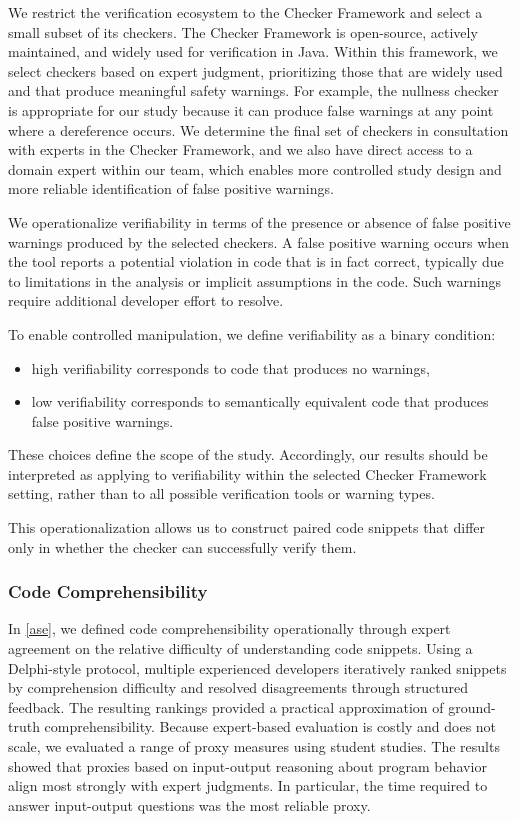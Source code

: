 We restrict the verification ecosystem to the Checker Framework and select a small subset of its checkers. The Checker Framework is open-source, actively maintained, and widely used for verification in Java. Within this framework, we select checkers based on expert judgment, prioritizing those that are widely used and that produce meaningful safety warnings. For example, the nullness checker is appropriate for our study because it can produce false warnings at any point where a dereference occurs. We determine the final set of checkers in consultation with experts in the Checker Framework, and we also have direct access to a domain expert within our team, which enables more controlled study design and more reliable identification of false positive warnings.

We operationalize verifiability in terms of the presence or absence of false positive warnings produced by the selected checkers. A false positive warning occurs when the tool reports a potential violation in code that is in fact correct, typically due to limitations in the analysis or implicit assumptions in the code. Such warnings require additional developer effort to resolve.

To enable controlled manipulation, we define verifiability as a binary condition:
\begin{itemize}
    \item high verifiability corresponds to code that produces no warnings,
    \item low verifiability corresponds to semantically equivalent code that produces false positive warnings.
\end{itemize}

These choices define the scope of the study. Accordingly, our results should be interpreted as applying to verifiability within the selected Checker Framework setting, rather than to all possible verification tools or warning types.

This operationalization allows us to construct paired code snippets that differ only in whether the checker can successfully verify them.

\subsubsection{Code Comprehensibility}

In \cref{ase}, we defined code comprehensibility operationally through expert agreement on the relative difficulty of understanding code snippets. Using a Delphi-style protocol, multiple experienced developers iteratively ranked snippets by comprehension difficulty and resolved disagreements through structured feedback. The resulting rankings provided a practical approximation of ground-truth comprehensibility. Because expert-based evaluation is costly and does not scale, we evaluated a range of proxy measures using student studies. The results showed that proxies based on input-output reasoning about program behavior align most strongly with expert judgments. In particular, the time required to answer input-output questions was the most reliable proxy.

